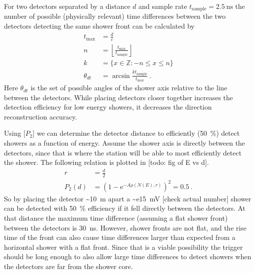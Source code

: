For two detectors separated by a distance $d$ and sample rate $t_{\mathrm{sample}} = \SI{2.5}{\ns}$ the number of possible (physically relevant) time differences between the two detectors detecting the same shower front can be calculated by
%
\begin{equation}
    \begin{split}
        t_{\mathrm{max}} &= \frac{d}{c} \\
        n &= \left\lfloor \frac{t_{\mathrm{max}}}{t_{\mathrm{sample}}} \right\rfloor \\
        k &= \{x \in \mathbb{Z} : -n \leq x \leq n \} \\
        \theta_{dt} &= \arcsin \frac{k t_{\mathrm{sample}}}{t_{\mathrm{max}}} \ .
    \end{split}
\end{equation}
%
Here $\theta_{dt}$ is the set of possible angles of the shower axis relative to the line between the detectors. While placing detectors closer together increases the detection efficiency for low energy showers, it decreases the direction reconstruction accuracy.

Using [$P_2$] we can determine the detector distance to efficiently (\SI{50}{\percent}) detect showers as a function of energy. Assume the shower axis is directly between the detectors, since that is where the station will be able to most efficiently detect the shower. The following relation is plotted in [todo: fig of E vs d].
%
\begin{equation}
\begin{split}
    r &= \frac{d}{2} \\
    P_2(d) &= \left(1 - \mathrm{e}^{-A \rho(N(E), r)} \right)^2 = 0.5 \ .
\end{split}
\end{equation}
%
So by placing the detector \SI{~10}{\meter} apart a \SI{~e15}{\mV} [check actual number] shower can be detected with \SI{50}{\percent} efficiency if it fell directly between the detectors. At that distance the maximum time difference (assuming a flat shower front) between the detectors is \SI{30}{\ns}. However, shower fronts are not flat, and the rise time of the front can also cause time differences larger than expected from a horizontal shower with a flat front. Since that is a viable possibility the trigger should be long enough to also allow large time differences to detect showers when the detectors are far from the shower core.

